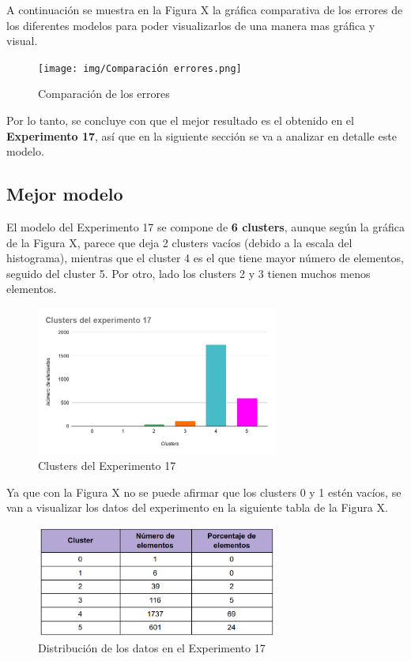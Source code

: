 \documentclass[12pt,a4paper, xcolor=table]{article}
\begin{document}
\vspace{3mm}

A continuación se muestra en la Figura X la gráfica comparativa de los errores de los diferentes modelos para poder visualizarlos de una manera mas gráfica y visual.

\begin{figure}[h]
    \centering
    \texttt{[image: img/Comparación errores.png]}
    \caption{Comparación de los errores}
    \label{fig:graf_exp1}
\end{figure}

Por lo tanto, se concluye con que el mejor resultado es el obtenido en el \textbf{Experimento 17}, así que en la siguiente sección se va a analizar en detalle este modelo.

\newpage


\subsection{Mejor modelo}

El modelo del Experimento 17 se compone de \textbf{6 clusters}, aunque según la gráfica de la Figura X, parece que deja 2 clusters vacíos (debido a la escala del histograma), mientras que el cluster 4 es el que tiene mayor número de elementos, seguido del cluster 5. Por otro, lado los clusters 2 y 3 tienen muchos menos elementos.

\begin{figure}[h]
    \centering
    \includegraphics[width=300px]{img/clusters_del_experimento_17.png}
    \caption{Clusters del Experimento 17}
    \label{fig:graf_exp1}
\end{figure}

Ya que con la Figura X no se puede afirmar que los clusters 0 y 1 estén vacíos, se van a visualizar los datos del experimento en la siguiente tabla de la Figura X.

\begin{figure}[h]
    \centering
    \includegraphics[width=300px]{img/clusters_mejor_exp.png}
    \caption{Distribución de los datos en el Experimento 17}
    \label{fig:graf_exp1}
\end{figure}
\end{document}
